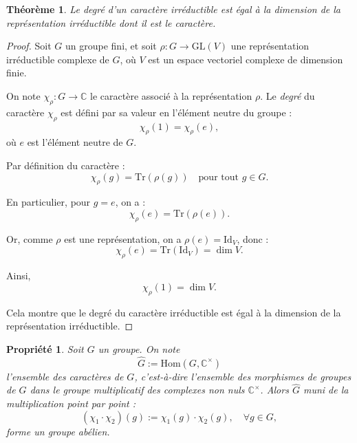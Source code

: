 \documentclass[12pt]{article}
\newtheorem{propriete}{Propriété}
\newtheorem{theoreme}{Théorème}
\begin{document}
	
	
	\newpage
	
	
	\begin{theoreme}
		Le degré d’un caractère irréductible est égal à la dimension de la représentation irréductible dont il est le caractère.
	\end{theoreme}
	
	\begin{proof}
		Soit \( G \) un groupe fini, et soit \( \rho : G \to \mathrm{GL}(V) \) une représentation irréductible complexe de \( G \), où \( V \) est un espace vectoriel complexe de dimension finie.
		
		On note \( \chi_\rho : G \to \mathbb{C} \) le caractère associé à la représentation \( \rho \). Le \emph{degré} du caractère \( \chi_\rho \) est défini par sa valeur en l’élément neutre du groupe :
		\[
		\chi_\rho(1) = \chi_\rho(e),
		\]
		où \( e \) est l’élément neutre de \( G \).
		
		Par définition du caractère :
		\[
		\chi_\rho(g) = \mathrm{Tr}(\rho(g)) \quad \text{pour tout } g \in G.
		\]
		
		En particulier, pour \( g = e \), on a :
		\[
		\chi_\rho(e) = \mathrm{Tr}(\rho(e)).
		\]
		
		Or, comme \( \rho \) est une représentation, on a \( \rho(e) = \mathrm{Id}_V \), donc :
		\[
		\chi_\rho(e) = \mathrm{Tr}(\mathrm{Id}_V) = \dim V.
		\]
		
		Ainsi,
		\[
		\chi_\rho(1) = \dim V.
		\]
		
		Cela montre que le degré du caractère irréductible est égal à la dimension de la représentation irréductible.
		
	\end{proof}
	
	
	\newpage
	
	\begin{propriete}
		Soit \( G \) un groupe. On note
		\[
		\widehat{G} := \mathrm{Hom}(G, \mathbb{C}^\times)
		\]
		l’ensemble des caractères de \( G \), c’est-à-dire l’ensemble des morphismes de groupes de \( G \) dans le groupe multiplicatif des complexes non nuls \( \mathbb{C}^\times \). Alors \( \widehat{G} \) muni de la multiplication point par point :
		\[
		(\chi_1 \cdot \chi_2)(g) := \chi_1(g) \cdot \chi_2(g), \quad \forall g \in G,
		\]
		forme un groupe abélien.
	\end{propriete}
	
\end{document}
